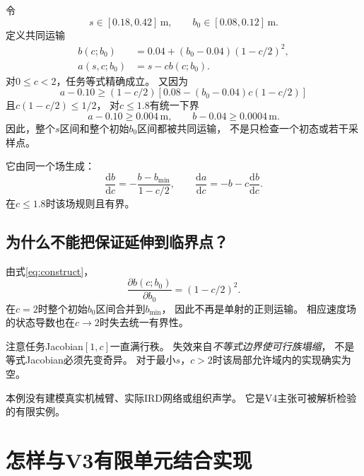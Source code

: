 \documentclass[UTF8,11pt,a4paper,fontset=fandol]{ctexart}
\numberwithin{equation}{section}
\theoremstyle{definition}
\newcommand{\dd}{\mathrm d}
\begin{document}
令
\begin{equation}
 s\in[0.18,0.42]\,\mathrm m,\qquad
 b_0\in[0.08,0.12]\,\mathrm m.
\end{equation}
定义共同运输
\begin{equation}
 \boxed{
 \begin{aligned}
 b(c;b_0)&=0.04+(b_0-0.04)(1-c/2)^2,\\
 a(s,c;b_0)&=s-cb(c;b_0).
 \end{aligned}
 }
 \label{eq:construct}
\end{equation}
对$0\leq c<2$，任务等式精确成立。
又因为
\begin{equation}
 a-0.10
 \geq
 (1-c/2)
 \left[
 0.08-(b_0-0.04)c(1-c/2)
 \right]
\end{equation}
且$c(1-c/2)\leq1/2$，
对$c\leq1.8$有统一下界
\begin{equation}
 a-0.10\geq0.004\,\mathrm m,\qquad
 b-0.04\geq0.0004\,\mathrm m.
\end{equation}
因此，整个$s$区间和整个初始$b_0$区间都被共同运输，
不是只检查一个初态或若干采样点。

它由同一个场生成：
\begin{equation}
 \frac{\dd b}{\dd c}
 =-\frac{b-b_{\min}}{1-c/2},\qquad
 \frac{\dd a}{\dd c}
 =-b-c\frac{\dd b}{\dd c}.
\end{equation}
在$c\leq1.8$时该场规则且有界。

\subsection{为什么不能把保证延伸到临界点？}

由式\eqref{eq:construct}，
\begin{equation}
 \frac{\partial b(c;b_0)}{\partial b_0}
 =(1-c/2)^2.
\end{equation}
在$c=2$时整个初始$b_0$区间合并到$b_{\min}$，
因此不再是单射的正则运输。
相应速度场的状态导数也在$c\to2$时失去统一有界性。

注意任务Jacobian$[1,c]$一直满行秩。
失效来自\emph{不等式边界使可行族塌缩}，
不是等式Jacobian必须先变奇异。
对于最小$s$，$c>2$时该局部允许域内的实现确实为空。

本例没有建模真实机械臂、实际IRD网络或组织声学。
它是V4主张可被解析检验的有限实例。

\section{怎样与V3有限单元结合实现}
\label{sec:validated}
\end{document}
